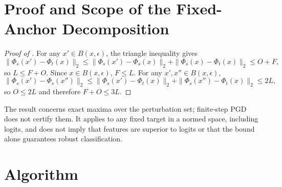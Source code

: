 \appendix

\section{Proof and Scope of the Fixed-Anchor Decomposition}
\label{app:anchor_scope}
\begin{proof}[Proof of ]
For any \(x'\in B(x,\epsilon)\), the triangle inequality gives
\[
\|\Phi_s(x')-\Phi_t(x)\|_2\le
\|\Phi_s(x')-\Phi_s(x)\|_2+\|\Phi_s(x)-\Phi_t(x)\|_2\le O+F,
\]
so \(L\le F+O\). Since \(x\in B(x,\epsilon)\), \(F\le L\). For any
\(x',x''\in B(x,\epsilon)\),
\[
\|\Phi_s(x')-\Phi_s(x'')\|_2\le
\|\Phi_s(x')-\Phi_t(x)\|_2+\|\Phi_s(x'')-\Phi_t(x)\|_2\le2L,
\]
so \(O\le2L\) and therefore \(F+O\le3L\).
\end{proof}
The result concerns exact maxima over the perturbation set; finite-step PGD
does not certify them. It applies to any fixed target in a normed space,
including logits, and does not imply that features are superior to logits or
that the bound alone guarantees robust classification.

\section{Algorithm}
\label{app:alg}

